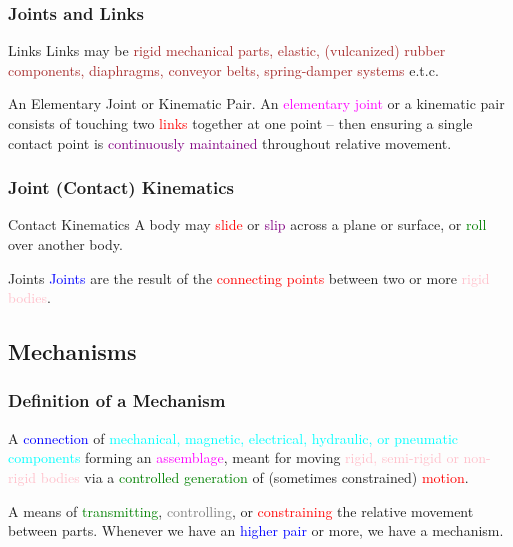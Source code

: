 \begin{frame}
	\frametitle{Joints and Links}
	\begin{block}{Links}
		\textcolor{light-blue}{Links} may be \textcolor{brown}{rigid mechanical parts, elastic, (vulcanized) rubber components, diaphragms, conveyor belts, spring-damper systems} e.t.c.
	\end{block}
	\begin{block}{An Elementary Joint or Kinematic Pair.}
		An \textcolor{magenta}{elementary joint} or a \textcolor{light-blue}{kinematic pair} consists of touching two \textcolor{red}{links} \textcolor{light-blue}{together at one point} -- then ensuring a single contact point is \textcolor{purple}{continuously maintained} throughout \textcolor{light-blue}{relative movement}. 
	\end{block}
\end{frame}



\begin{frame}
	\frametitle{Joint (Contact) Kinematics}
	\begin{block}{Contact Kinematics}
		A body may \textcolor{red}{slide} or  \textcolor{purple}{slip} across a \textcolor{light-blue}{plane or surface}, or \textcolor{green}{roll} over another body. 
	\end{block}
	\begin{block}{Joints}
		\textcolor{blue}{Joints} are the result of the \textcolor{red}{connecting points} between two or more \textcolor{pink}{rigid bodies}.
	\end{block}
\end{frame}

\subsection{Mechanisms}
\begin{frame}
	\frametitle{Definition of a Mechanism}
	\begin{definition}
		A \textcolor{blue}{connection} of  \textcolor{cyan}{mechanical, magnetic, electrical, hydraulic, or pneumatic components} forming an \textcolor{magenta}{assemblage}, meant for moving \textcolor{pink}{rigid, semi-rigid or non-rigid bodies} via a \textcolor{green}{controlled generation} of (sometimes constrained) \textcolor{red}{motion}.
	\end{definition}
	\begin{tcolorbox}[coltitle=red!80!black,colframe=magenta!25,title=Kenneth Hunt (1978)]
		A means of \textcolor{green}{transmitting}, \textcolor{gray}{controlling}, or \textcolor{red}{constraining} the relative movement between parts. Whenever we have an \textcolor{blue}{higher pair} or more, we have a mechanism. 
	\end{tcolorbox}
\end{frame}



